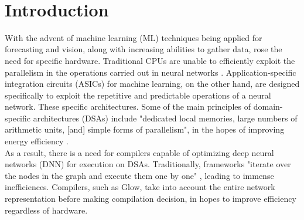 \documentclass[twocolumn]{article}
\begin{document}
\

{\newpage}

\maketitle        


\section{Introduction}

With the advent of machine learning (ML) techniques being applied for forecasting and vision, along with increasing abilities to gather data, rose the need for specific hardware. Traditional CPUs are unable to efficiently exploit the parallelism in the operations carried out in neural networks \cite{sze2017hardware}. Application-specific integration circuits (ASICs) for machine learning, on the other hand, are designed specifically to exploit the repetitive and predictable operations of a neural network. These specific architectures. Some of the main principles of domain-specific architectures (DSAs) include "dedicated local memories, large numbers of arithmetic units, [and] simple forms of parallelism", in the hopes of improving energy efficiency \cite{rotem2018glow}.\\

As a result, there is a need for compilers capable of optimizing deep neural networks (DNN) for execution on DSAs. Traditionally, frameworks "iterate over the nodes in the graph and execute them one by one" \cite{rotem2018glow}, leading to immense inefficiences. Compilers, such as Glow, take into account the entire network representation before making compilation decision, in hopes to improve efficiency regardless of hardware. \\
\end{document}
